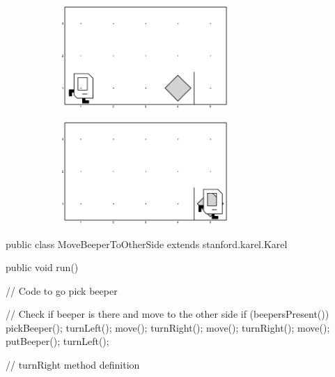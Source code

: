 \begin{sloppypar}
\begin{figure}[tbh!]
    \begin{subfigure}[t]{0.46\textwidth}
        \includegraphics[width=2.5in, left]{ch02/MoveBeeperToOtherSide/init_w2.jpg}
        \caption{}
        \label{subfig:MooveMoveBeeperToOtherSideInitW2}
    \end{subfigure}
    \hspace{0.1in}
    \begin{subfigure}[t]{0.46\textwidth}
        \includegraphics[width=2.5in, left]{ch02/MoveBeeperToOtherSide/final_w2.jpg}
        \caption{}
    \end{subfigure}
    \label{fig:MooveMoveBeeperToOtherSide}
\end{figure}

\begin{lstcodesimple}[float, caption={\mycodelstcpt{MoveBeeperToOtherSide.java}}, label={lst:MoveBeeperToOtherSide}]
public class MoveBeeperToOtherSide extends stanford.karel.Karel {
    public void run() {

            // Code to go pick beeper

            // Check if beeper is there and move to the other side
            if (beepersPresent()) {
                    pickBeeper();
                    turnLeft();
                    move();
                    turnRight();
                    move();
                    turnRight();
                    move();
                    putBeeper();
                    turnLeft();
            }
    }

    // turnRight method definition
}

\end{lstcodesimple}


\end{sloppypar}
